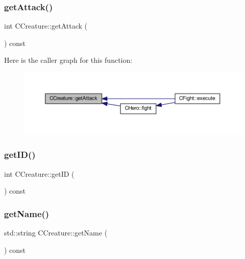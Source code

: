 \subsubsection{\texorpdfstring{get\+Attack()}{getAttack()}}
{\footnotesize\ttfamily int C\+Creature\+::get\+Attack (\begin{DoxyParamCaption}{ }\end{DoxyParamCaption}) const\hspace{0.3cm}{\ttfamily [inline]}}

Here is the caller graph for this function\+:\nopagebreak
\begin{figure}[H]
\begin{center}
\leavevmode
\includegraphics[width=350pt]{class_c_creature_ab586f3c2dd37addfa8281fd4d24c7b54_icgraph}
\end{center}
\end{figure}
\mbox{\label{class_c_creature_af6793eced5b6c7a88b939b3acac7c366}} 
\subsubsection{\texorpdfstring{get\+I\+D()}{getID()}}
{\footnotesize\ttfamily int C\+Creature\+::get\+ID (\begin{DoxyParamCaption}{ }\end{DoxyParamCaption}) const\hspace{0.3cm}{\ttfamily [inline]}}

\mbox{\label{class_c_creature_add6ec843df265dc929acc0c3ef7ba8d0}} 
\subsubsection{\texorpdfstring{get\+Name()}{getName()}}
{\footnotesize\ttfamily std\+::string C\+Creature\+::get\+Name (\begin{DoxyParamCaption}{ }\end{DoxyParamCaption}) const\hspace{0.3cm}{\ttfamily [inline]}}

